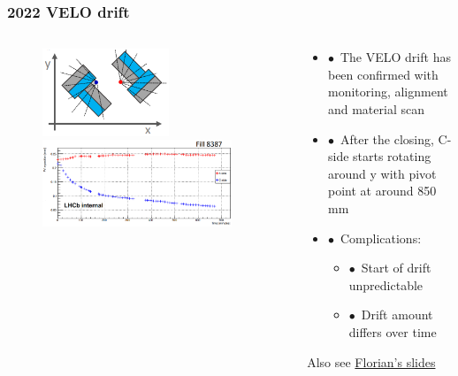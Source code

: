 \documentclass[aspectratio=1610, 12pt, xcolor=dvipsnames]{beamer}
\begin{document}
\begin{frame}\frametitle{2022 VELO drift}
  \begin{columns}
    \begin{column}[c]{0.52\textwidth}
      \begin{figure}
        \includegraphics[width=0.6\textwidth]{plots/velo_axes.png}
        \includegraphics[width=0.9\textwidth]{plots/c_side_drift_freiss.png}
      \end{figure}
    \end{column}
    \begin{column}[c]{0.44\textwidth}
      \begin{itemize}
        \item $\bullet$\, The VELO drift has been confirmed with monitoring, alignment and material scan
        \item $\bullet$\, After the closing, C-side starts rotating around y with pivot point at around 850 mm
        \item $\bullet$\, Complications:
        \begin{itemize}
          \item $\bullet$\, Start of drift unpredictable
          \item $\bullet$\, Drift amount differs over time
        \end{itemize}
      \end{itemize}
      Also see \href{https://indico.cern.ch/event/1272210/contributions/5370939/attachments/2641017/4570404/2023_05_04_ASWeek_FReiss.pdf}{Florian's slides}
    \end{column}
  \end{columns}
\end{frame}
\end{document}
